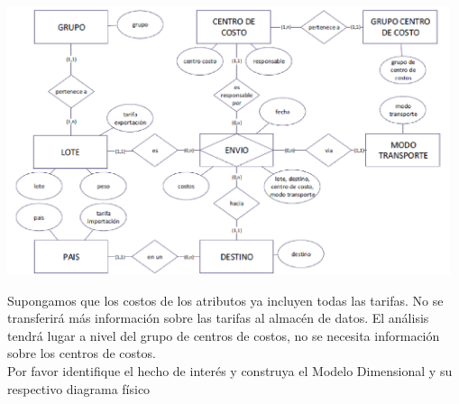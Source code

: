 \documentclass[12pt,letterpaper]{article}
\begin{document}
\begin{center}
    \includegraphics[width=13cm]{./img/img1.png}
\end{center}

Supongamos que los costos de los atributos ya incluyen todas las tarifas. No se transferirá más información sobre las tarifas al almacén de datos. El análisis tendrá lugar a nivel del grupo de centros de costos, no se necesita información sobre los centros de costos.\\

Por favor identifique el hecho de interés y construya el Modelo Dimensional y su respectivo diagrama físico
\end{document}
